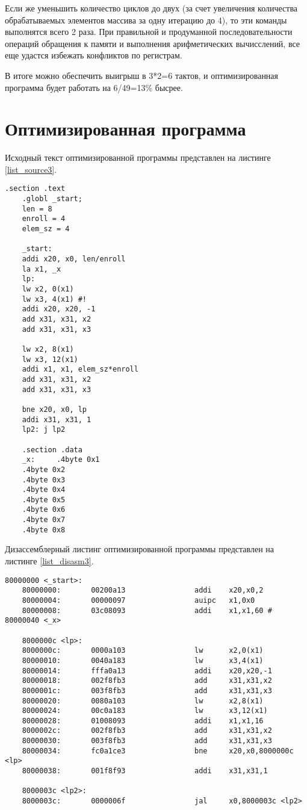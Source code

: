 Если же уменьшить количество циклов до двух (за счет увеличения количества обрабатываемых элементов массива за одну итерацию до 4), то эти команды выполнятся всего 2 раза. При правильной и продуманной последовательности операций обращения к памяти и выполнения арифметических вычисслений, все еще удастся избежать конфликтов по регистрам. 

В итоге можно обеспечить выигрыш в 3*2=6 тактов, и оптимизированная программа будет работать на 6/49=13\% бысрее.


\section*{Оптимизированная программа}

Исходный текст оптимизированной программы  представлен на листинге \ref{list_source3}.

\begin{lstlisting}[caption=Исходный текст оптимизированной программы,
	label={list_source3}]
	        .section .text
	.globl _start;
	len = 8 
	enroll = 4 
	elem_sz = 4
	
	_start:
	addi x20, x0, len/enroll
	la x1, _x
	lp:
	lw x2, 0(x1)
	lw x3, 4(x1) #!
	addi x20, x20, -1
	add x31, x31, x2
	add x31, x31, x3
	
	lw x2, 8(x1)
	lw x3, 12(x1)
	addi x1, x1, elem_sz*enroll
	add x31, x31, x2
	add x31, x31, x3
	
	bne x20, x0, lp
	addi x31, x31, 1
	lp2: j lp2
	
	.section .data
	_x:     .4byte 0x1
	.4byte 0x2
	.4byte 0x3
	.4byte 0x4
	.4byte 0x5
	.4byte 0x6
	.4byte 0x7
	.4byte 0x8
\end{lstlisting}

\clearpage
Дизассемблерный листинг оптимизированной программы  представлен на листинге \ref{list_disasm3}.


\begin{lstlisting}[caption=Дизассемблерный листинг оптимизированной программы,
	label={list_disasm3}]
	80000000 <_start>:
	80000000:       00200a13                addi    x20,x0,2
	80000004:       00000097                auipc   x1,0x0
	80000008:       03c08093                addi    x1,x1,60 # 80000040 <_x>
	
	8000000c <lp>:
	8000000c:       0000a103                lw      x2,0(x1)
	80000010:       0040a183                lw      x3,4(x1)
	80000014:       fffa0a13                addi    x20,x20,-1
	80000018:       002f8fb3                add     x31,x31,x2
	8000001c:       003f8fb3                add     x31,x31,x3
	80000020:       0080a103                lw      x2,8(x1)
	80000024:       00c0a183                lw      x3,12(x1)
	80000028:       01008093                addi    x1,x1,16
	8000002c:       002f8fb3                add     x31,x31,x2
	80000030:       003f8fb3                add     x31,x31,x3
	80000034:       fc0a1ce3                bne     x20,x0,8000000c <lp>
	80000038:       001f8f93                addi    x31,x31,1
	
	8000003c <lp2>:
	8000003c:       0000006f                jal     x0,8000003c <lp2>
\end{lstlisting}

